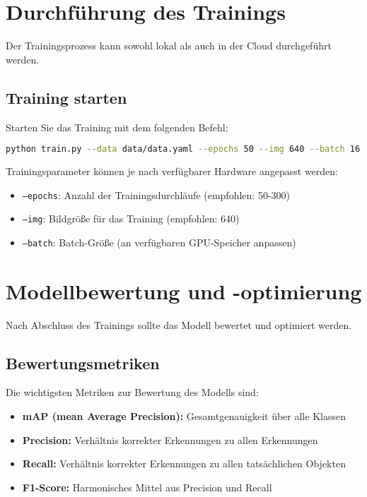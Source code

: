 \documentclass[12pt, a4paper]{scrreprt}
\begin{document}
\section{Durchführung des Trainings}
Der Trainingsprozess kann sowohl lokal als auch in der Cloud durchgeführt werden.

\subsection{Training starten}
Starten Sie das Training mit dem folgenden Befehl:
\begin{lstlisting}[language=bash]
python train.py --data data/data.yaml --epochs 50 --img 640 --batch 16
\end{lstlisting}

Trainingsparameter können je nach verfügbarer Hardware angepasst werden:
\begin{itemize}
    \item \texttt{--epochs}: Anzahl der Trainingsdurchläufe (empfohlen: 50-300)
    \item \texttt{--img}: Bildgröße für das Training (empfohlen: 640)
    \item \texttt{--batch}: Batch-Größe (an verfügbaren GPU-Speicher anpassen)
\end{itemize}

\section{Modellbewertung und -optimierung}
Nach Abschluss des Trainings sollte das Modell bewertet und optimiert werden.

\subsection{Bewertungsmetriken}
Die wichtigsten Metriken zur Bewertung des Modells sind:
\begin{itemize}
    \item \textbf{mAP (mean Average Precision):} Gesamtgenauigkeit über alle Klassen
    \item \textbf{Precision:} Verhältnis korrekter Erkennungen zu allen Erkennungen
    \item \textbf{Recall:} Verhältnis korrekter Erkennungen zu allen tatsächlichen Objekten
    \item \textbf{F1-Score:} Harmonisches Mittel aus Precision und Recall
\end{itemize}
\end{document}
